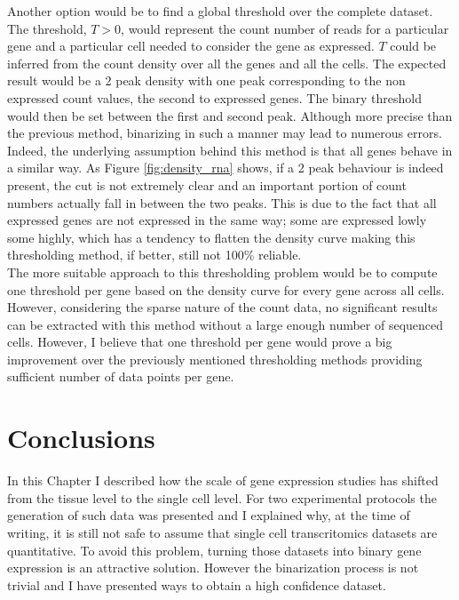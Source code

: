   Another option would be to find a global threshold over the complete dataset. The threshold, $T>0$, would represent the count number of reads for a particular gene and a particular cell needed to consider the gene as expressed. $T$ could be inferred from the count density over all the genes and all the cells. The expected result would be a 2 peak density with one peak corresponding to the non expressed count values, the second to expressed genes. The binary threshold would then be set between the first and second peak. Although more precise than the previous method, binarizing in such a manner may lead to numerous errors. Indeed, the underlying assumption behind this method is that all genes behave in a similar way. As Figure \ref{fig:density_rna} shows, if a 2 peak behaviour is indeed present, the cut is not extremely clear and an important portion of count numbers actually fall in between the two peaks. This is due to the fact that all expressed genes are not expressed in the same way; some are expressed lowly some highly, which has a tendency to flatten the density curve making this thresholding method, if better, still not 100\% reliable.\\
  
  The more suitable approach to this thresholding problem would be to compute one threshold per gene based on the density curve for every gene across all cells. However, considering the sparse nature of the count data, no significant results can be extracted with this method without a large enough number of sequenced cells. However, I believe that one threshold per gene would prove a big improvement over the previously mentioned thresholding methods providing sufficient number of data points per gene.



\section{Conclusions}
In this Chapter I described how the scale of gene expression studies has shifted from the tissue level to the single cell level. For two experimental protocols the generation of such data was presented and I explained why, at the time of writing, it is still not safe to assume that single cell transcritomics datasets are quantitative. To avoid this problem, turning those datasets into binary gene expression is an attractive solution. However the binarization process is not trivial and I have presented ways to obtain a high confidence dataset.\\

